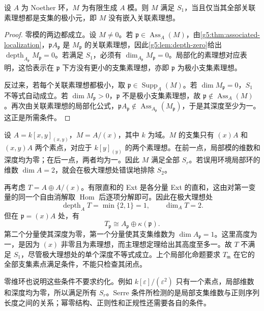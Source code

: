 \begin{proposition}\label{g5:prop:serre-s1-associated}
	设 \(A\) 为 Noether 环，\(M\) 为有限生成 \(A\) 模。则 \(M\) 满足 \(S_1\)，当且仅当其全部关联素理想都是支集的极小元，即 \(M\) 没有嵌入关联素理想。
\end{proposition}
\begin{proof}
	零模的两边都成立。设 \(M\ne0\)。若 \(\mathfrak p\in\operatorname{Ass}_A(M)\)，由\cref{g5:thm:associated-localization}，\(\mathfrak pA_{\mathfrak p}\) 是 \(M_{\mathfrak p}\) 的关联素理想，因此\cref{g5:lem:depth-zero}给出 \(\operatorname{depth}_{A_{\mathfrak p}}M_{\mathfrak p}=0\)。若满足 \(S_1\)，必须有 \(\dim_{A_{\mathfrak p}}M_{\mathfrak p}=0\)。局部化的素理想对应表明，这恰表示在 \(\mathfrak p\) 下方没有更小的支集素理想，亦即 \(\mathfrak p\) 为极小支集素理想。

	反过来，若每个关联素理想都极小，取 \(\mathfrak p\in\operatorname{Supp}_A(M)\)。若 \(\dim M_{\mathfrak p}=0\)，\(S_1\) 不等式自动成立。若 \(\dim M_{\mathfrak p}>0\)，\(\mathfrak p\) 不是极小支集素理想，故 \(\mathfrak p\notin\operatorname{Ass}_A(M)\)。再次由关联素理想的局部化公式，\(\mathfrak pA_{\mathfrak p}\notin\operatorname{Ass}_{A_{\mathfrak p}}(M_{\mathfrak p})\)，于是其深度至少为一。这正是所需条件。
\end{proof}

\begin{example}\label{g5:exm:serre-support-and-closed-point}
	设 \(A=k[x,y]_{(x,y)}\)，\(M=A/(x)\)，其中 \(k\) 为域。\(M\) 的支集只有 \((x)A\) 和 \((x,y)A\) 两个素点，对应于 \(k[y]_{(y)}\) 的两个素理想。在前一点，局部模的维数和深度均为零；在后一点，两者均为一。因此 \(M\) 满足全部 \(S_r\)。若误用环境局部环的维数 \(\dim A=2\)，就会在极大理想处错误地排除 \(S_2\)。

	再考虑 \(T=A\oplus A/(x)\)。有限直和的 Ext 是各分量 Ext 的直和，这由对第一变量的同一个自由消解取 \(\operatorname{Hom}\) 后逐项分解即可。因此在极大理想处
	\[
		\operatorname{depth}_A T=\min\{2,1\}=1,
		\qquad \dim_A T=2.
	\]
	但在 \(\mathfrak p=(x)A\) 处，有
	\[
		T_{\mathfrak p}\cong A_{\mathfrak p}\oplus\kappa(\mathfrak p).
	\]
	第二个分量使其深度为零，第一个分量使其支集维数为 \(\dim A_{\mathfrak p}=1\)。这里高度为一，是因为 \((x)\) 非零且为素理想，而主理想定理给出其高度至多一。故 \(T\) 不满足 \(S_1\)，尽管极大理想处的单个深度不等式成立。上个局部化命题要求 \(T_{\mathfrak m}\) 在它的全部支集素点满足条件，不能只检查其闭点。
\end{example}

零维环也说明这些条件不要求约化。例如 \(k[\varepsilon]/(\varepsilon^2)\) 只有一个素点，局部维数和深度均为零，所以满足所有 \(S_r\)。Serre 条件所检测的是局部支集维数与正则序列长度之间的关系；幂零结构、正则性和正规性还需要各自的条件。
